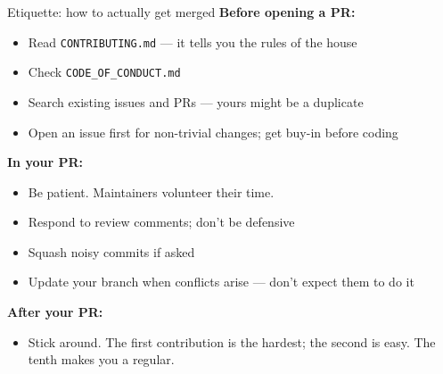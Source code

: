 \documentclass[10pt,aspectratio=169]{beamer}
\begin{document}
\begin{frame}{Etiquette: how to actually get merged}
  \textbf{Before opening a PR:}
  \begin{itemize}
    \item Read \texttt{CONTRIBUTING.md} --- it tells you the rules of the house
    \item Check \texttt{CODE\_OF\_CONDUCT.md}
    \item Search existing issues and PRs --- yours might be a duplicate
    \item Open an issue first for non-trivial changes; get buy-in before coding
  \end{itemize}

  \vspace{0.4em}
  \textbf{In your PR:}
  \begin{itemize}
    \item Be patient. Maintainers volunteer their time.
    \item Respond to review comments; don't be defensive
    \item Squash noisy commits if asked
    \item Update your branch when conflicts arise --- don't expect them to do it
  \end{itemize}

  \vspace{0.4em}
  \textbf{After your PR:}
  \begin{itemize}
    \item Stick around. The first contribution is the hardest;
          the second is easy. The tenth makes you a regular.
  \end{itemize}
\end{frame}

\end{document}
